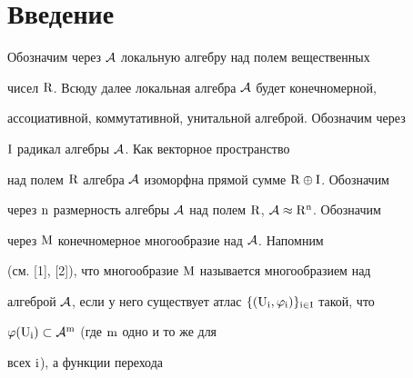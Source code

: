  


\date{} 




\pagestyle{plain} %


 




\maketitle 


\label{begin} 


 


 


 


\section{Введение} 


 


Обозначим через $\cal A$ локальную алгебру над полем вещественных 


чисел $\mathrm R$. Всюду далее локальная алгебра $\cal A$ будет конечномерной, 


ассоциативной, коммутативной, унитальной алгеброй. Обозначим через 


$\mathrm I$ радикал алгебры $\cal A$. Как векторное пространство 


над полем $\M R$ алгебра $\cal A$ изоморфна прямой сумме $\M R\oplus\M 


I$. Обозначим 


через $\M n$ размерность алгебры $\cal A$ над полем $\M R$, $\cal 


A\approx\M R^{\M n}$. Обозначим 


через $\mathrm M$ конечномерное многообразие над $\cal A$. Напомним 


(см. [1], [2]), что многообразие $\mathrm M$ называется многообразием над 


алгеброй $\cal A$, если у него существует атлас $\{(\M U_{\M 


i},\varphi_{\M i})\}_{\M i\in\M I}$ такой, что 


$\varphi(\mathrm U_{\mathrm i})\subset\cal A^{\mathrm m}$ (где $\mathrm m$ одно и то же для 


всех $\mathrm i$), а функции перехода 


